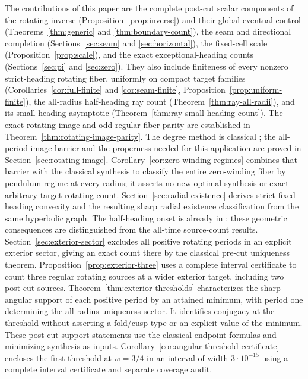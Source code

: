 \documentclass[11pt,a4paper]{article}
\theoremstyle{remark}\newtheorem{remark}[theorem]{Remark}
\begin{document}
The contributions of this paper are the complete post-cut scalar
components of the rotating inverse (Proposition~\ref{prop:inverse}) and
their global eventual control (Theorems~\ref{thm:generic} and
\ref{thm:boundary-count}), the seam and directional completion
(Sections~\ref{sec:seam} and \ref{sec:horizontal}), the fixed-cell scale
(Proposition~\ref{prop:scale}), and the exact exceptional-heading counts
(Sections~\ref{sec:pi} and \ref{sec:zero}). They also include finiteness
of every nonzero strict-heading rotating fiber, uniformly on compact
target families (Corollaries~\ref{cor:full-finite} and
\ref{cor:seam-finite}, Proposition~\ref{prop:uniform-finite}), the
all-radius half-heading ray count (Theorem~\ref{thm:ray-all-radii}),
and its small-heading asymptotic (Theorem~\ref{thm:ray-small-heading-count}).
The exact rotating image and odd regular-fiber parity are established in
Theorem~\ref{thm:rotating-image-parity}. The degree method is classical
\cite[Section 4]{Milnor}; the all-period image barrier and the properness
needed for this application are proved in Section~\ref{sec:rotating-image}.
Corollary~\ref{cor:zero-winding-regimes} combines that barrier with
the classical synthesis \cite{SS} to classify the entire zero-winding
fiber by pendulum regime at every radius; it asserts no new optimal
synthesis or exact arbitrary-target rotating count.
Section~\ref{sec:radial-existence} derives strict fixed-heading convexity
and the resulting sharp radial existence classification from the same
hyperbolic graph. The half-heading onset is already in
\cite[(2.13), Lemma 2.3]{SS}; these geometric consequences are
distinguished from the all-time source-count results.
Section~\ref{sec:exterior-sector} excludes all positive rotating periods
in an explicit exterior sector, giving an exact count there by the
classical pre-cut uniqueness theorem. Proposition~\ref{prop:exterior-three}
uses a complete interval certificate to count three regular rotating
sources at a wider exterior target, including two post-cut sources.
Theorem~\ref{thm:exterior-thresholds} characterizes the sharp angular
support of each positive period by an attained minimum, with period one
determining the all-radius uniqueness sector. It identifies conjugacy
at the threshold without asserting a fold/cusp type or an explicit value
of the minimum. These post-cut support statements use the classical
endpoint formulas and minimizing synthesis as inputs.
Corollary~\ref{cor:angular-threshold-certificate} encloses the first
threshold at $w=3/4$ in an interval of width $3\cdot10^{-15}$ using
a complete interval certificate and separate coverage audit.
\end{document}
